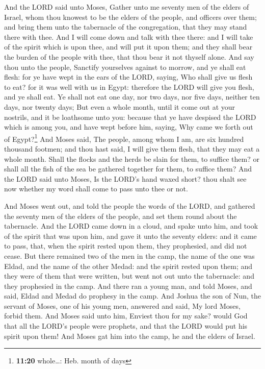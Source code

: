  And the LORD said unto Moses, Gather unto me seventy men
of the elders of Israel, whom thou knowest to be the elders of the
people, and officers over them; and bring them unto the tabernacle of
the congregation, that they may stand there with thee. 
And I will come down and talk with thee there: and I will take of the
spirit which is upon thee, and will put it upon them; and they shall
bear the burden of the people with thee, that thou bear it not thyself
alone.  And say thou unto the people, Sanctify yourselves
against to morrow, and ye shall eat flesh: for ye have wept in the ears
of the LORD, saying, Who shall give us flesh to eat? for it was well
with us in Egypt: therefore the LORD will give you flesh, and ye shall
eat.  Ye shall not eat one day, nor two days, nor five
days, neither ten days, nor twenty days;  But even a
whole month, until it come out at your nostrils, and it be loathsome
unto you: because that ye have despised the LORD which is among you, and
have wept before him, saying, Why came we forth out of Egypt?\footnote{\textbf{11:20}
  whole\ldots: Heb. month of days}  And Moses said, The
people, among whom I am, are six hundred thousand footmen; and thou hast
said, I will give them flesh, that they may eat a whole month.
 Shall the flocks and the herds be slain for them, to
suffice them? or shall all the fish of the sea be gathered together for
them, to suffice them?  And the LORD said unto Moses, Is
the LORD's hand waxed short? thou shalt see now whether my word shall
come to pass unto thee or not.

 And Moses went out, and told the people the words of the
LORD, and gathered the seventy men of the elders of the people, and set
them round about the tabernacle.  And the LORD came down
in a cloud, and spake unto him, and took of the spirit that was upon
him, and gave it unto the seventy elders: and it came to pass, that,
when the spirit rested upon them, they prophesied, and did not cease.
 But there remained two of the men in the camp, the name
of the one was Eldad, and the name of the other Medad: and the spirit
rested upon them; and they were of them that were written, but went not
out unto the tabernacle: and they prophesied in the camp.
 And there ran a young man, and told Moses, and said,
Eldad and Medad do prophesy in the camp.  And Joshua the
son of Nun, the servant of Moses, one of his young men, answered and
said, My lord Moses, forbid them.  And Moses said unto
him, Enviest thou for my sake? would God that all the LORD's people were
prophets, and that the LORD would put his spirit upon them!
 And Moses gat him into the camp, he and the elders of
Israel.

